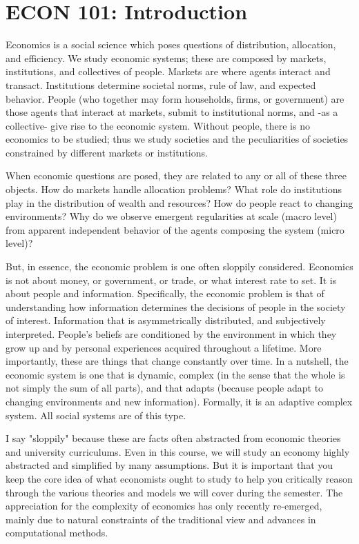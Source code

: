 \documentclass[10pt]{article}
\begin{document}
\section*{ECON 101: Introduction}
Economics is a social science which poses questions of distribution, allocation, and efficiency. We study economic systems; these are composed by markets, institutions, and collectives of people. Markets are where agents interact and transact. Institutions determine societal norms, rule of law, and expected behavior. People (who together may form households, firms, or government) are those agents that interact at markets, submit to institutional norms, and -as a collective- give rise to the economic system. Without people, there is no economics to be studied; thus we study societies and the peculiarities of societies constrained by different markets or institutions.

When economic questions are posed, they are related to any or all of these three objects. How do markets handle allocation problems? What role do institutions play in the distribution of wealth and resources? How do people react to changing environments? Why do we observe emergent regularities at scale (macro level) from apparent independent behavior of the agents composing the system (micro level)?

But, in essence, the economic problem is one often sloppily considered. Economics is not about money, or government, or trade, or what interest rate to set. It is about people and information. Specifically, the economic problem is that of understanding how information determines the decisions of people in the society of interest. Information that is asymmetrically distributed, and subjectively interpreted. People's beliefs are conditioned by the environment in which they grow up and by personal experiences acquired throughout a lifetime. More importantly, these are things that change constantly over time. In a nutshell, the economic system is one that is dynamic, complex (in the sense that the whole is not simply the sum of all parts), and that adapts (because people adapt to changing environments and new information). Formally, it is an adaptive complex system. All social systems are of this type.

I say "sloppily" because these are facts often abstracted from economic theories and university curriculums. Even in this course, we will study an economy highly abstracted and simplified by many assumptions. But it is important that you keep the core idea of what economists ought to study to help you critically reason through the various theories and models we will cover during the semester. The appreciation for the complexity of economics has only recently re-emerged, mainly due to natural constraints of the traditional view and advances in computational methods.
\end{document}
